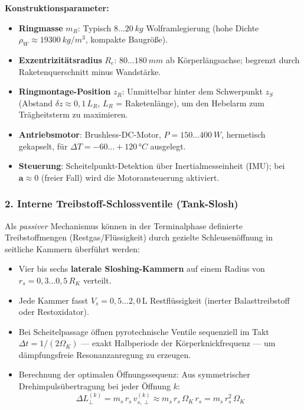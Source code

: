 ﻿\documentclass[12pt,a4paper]{article}
\newcommand{\vek}[1]{\boldsymbol{#1}}
\begin{document}
\textbf{Konstruktionsparameter:}
\begin{itemize}[leftmargin=*]
  \item \textbf{Ringmasse} $m_R$: Typisch $8\ldots\SI{20}{kg}$ Wolframlegierung
    (hohe Dichte $\rho_W \approx \SI{19300}{kg/m^3}$, kompakte Baugröße).
  \item \textbf{Exzentrizitätsradius} $R_e$: $80\ldots\SI{180}{mm}$ ab Körperlängsachse;
    begrenzt durch Raketenquerschnitt minus Wandstärke.
  \item \textbf{Ringmontage-Position} $z_R$: Unmittelbar hinter dem Schwerpunkt $z_S$
    (Abstand $\delta z \approx 0{,}1\,L_{R}$, $L_R$ = Raketenlänge),
    um den Hebelarm zum Trägheitsterm zu maximieren.
  \item \textbf{Antriebsmotor}: Brushless-DC-Motor, $P = 150\ldots\SI{400}{W}$,
    hermetisch gekapselt, für $\Delta T = -60\ldots+120\, °C$ ausgelegt.
  \item \textbf{Steuerung}: Scheitelpunkt-Detektion über Inertialmesseinheit (IMU);
    bei $\vek{a} \approx 0$ (freier Fall) wird die Motoransteuerung aktiviert.
\end{itemize}

\subsubsection{2. Interne Treibstoff-Schlossventile (Tank-Slosh)}

Als \emph{passiver} Mechanismus können in der Terminalphase definierte Treibstoffmengen
(Restgas/Flüssigkeit) durch gezielte Schleusenöffnung in seitliche Kammern überführt
werden:

\begin{itemize}[leftmargin=*]
  \item Vier bis sechs \textbf{laterale Sloshing-Kammern} auf einem Radius von
    $r_s = 0{,}3\ldots0{,}5\,R_K$ verteilt.
  \item Jede Kammer fasst $V_s = 0{,}5\ldots2{,}0\,\mathrm{L}$ Restflüssigkeit
    (inerter Balasttreibstoff oder Restoxidator).
  \item Bei Scheitelpassage öffnen pyrotechnische Ventile sequenziell im Takt
    $\Delta t = 1/(2\Omega_K)$ --- exakt Halbperiode der Körperknickfrequenz ---
    um dämpfungsfreie Resonanzanregung zu erzeugen.
  \item Berechnung der optimalen Öffnungssequenz: Aus symmetrischer Drehimpulsübertragung
    bei jeder Öffnung $k$:
    \[
      \Delta L_\perp^{(k)} = m_s\,r_s\,v_{s,\perp}^{(k)}
      \approx m_s\,r_s\,\Omega_K\,r_s = m_s\,r_s^2\,\Omega_K
    \]
\end{itemize}
\end{document}
